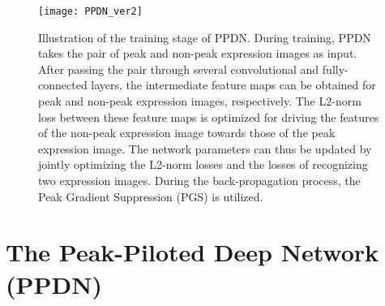 \documentclass[runningheads]{llncs}
\begin{document}
\begin{figure}[t]
	\centering
	\texttt{[image: PPDN\_ver2]}
	\caption{Illustration of the training stage of PPDN. During training, PPDN takes the pair of peak and non-peak expression images as input. After passing the pair through several convolutional and fully-connected layers, the intermediate feature maps can be obtained for peak and non-peak expression images, respectively. The L2-norm loss between these feature maps is optimized for driving the features of the non-peak expression image towards those of the peak expression image. The network parameters can thus be updated by jointly optimizing the L2-norm losses and the losses of recognizing two expression images. During the back-propagation process, the Peak Gradient Suppression (PGS) is utilized.}
	\label{fig:architecture}
\end{figure}


\section{The Peak-Piloted Deep Network (PPDN)}
\end{document}
